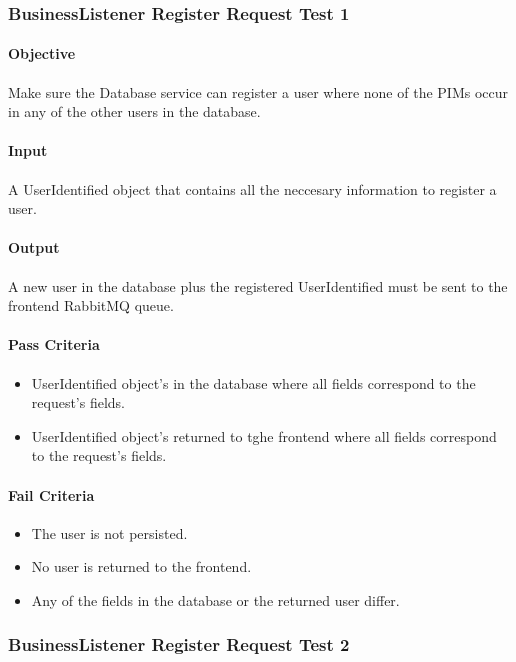 \documentclass[hidelinks,english]{article}
\begin{document}
			\subsubsection{BusinessListener Register Request Test 1}\label{databasebusinesslistenerregistertest1}
				\paragraph{Objective} Make sure the Database service can register a user where none of the PIMs occur in any of the other users in the database.
				\paragraph{Input} A UserIdentified object that contains all the neccesary information to register a user.
				\paragraph{Output} A new user in the database plus the registered UserIdentified must be sent to the frontend RabbitMQ queue.
				\paragraph{Pass Criteria}
				\begin{itemize}
					\item UserIdentified object's in the database where all fields correspond to the request's fields.
					\item UserIdentified object's returned to tghe frontend where all fields correspond to the request's fields.
				\end{itemize}
				\paragraph{Fail Criteria}
				\begin{itemize}
					\item The user is not persisted.
					\item No user is returned to the frontend.
					\item Any of the fields in the database or the returned user differ.
				\end{itemize}
				
			\subsubsection{BusinessListener Register Request Test 2}\label{databasebusinesslistenerregistertest2}
\end{document}
